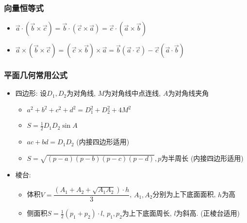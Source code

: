 \documentclass[10pt, a4paper]{article}
\begin{document}
    \subsubsection{向量恒等式}
    \begin{itemize}
      \item $\vec{a} \cdot (\vec{b} \times \vec{c}) = \vec{b} \cdot (\vec{c} \times \vec{a}) = \vec{c} \cdot (\vec{a} \times \vec{b})$
      \item $\vec{a} \times (\vec{b} \times \vec{c}) = (\vec{c} \times \vec{b}) \times \vec{a} = \vec{b}(\vec{a} \cdot \vec{c}) - \vec{c}(\vec{a} \cdot \vec{b})$
    \end{itemize}

    \subsubsection{平面几何常用公式}
    \begin{itemize}
    \item 四边形: 设$D_1, D_2$为对角线, $M$为对角线中点连线, $A$为对角线夹角
      \begin{itemize}
      \item $a^2 + b^2 + c^2 + d^2 = D_1^2 + D_2 ^ 2 + 4 M^2$
      \item $S = \frac{1}{2} D_1  D_2 \sin A$
      \item $ac + bd = D_1 D_2$ (内接四边形适用)
      \item $S = \sqrt{(p - a)(p - b)(p - c)(p - d)}, p$为半周长 (内接四边形适用)
      \end{itemize}
    \item 棱台:
      \begin{itemize}
      \item 体积$V = \dfrac{(A_1 + A_2 + \sqrt{A_1 A_2}) \cdot h}{3}$, $A_1, A_2$分别为上下底面面积, $h$为高
      \item 侧面积$S = \frac{1}{2} (p_1 + p_2) \cdot l$, $p_1, p_2$为上下底面周长, $l$为斜高. (正棱台适用)
      \end{itemize}
    \end{itemize}
\end{document}
